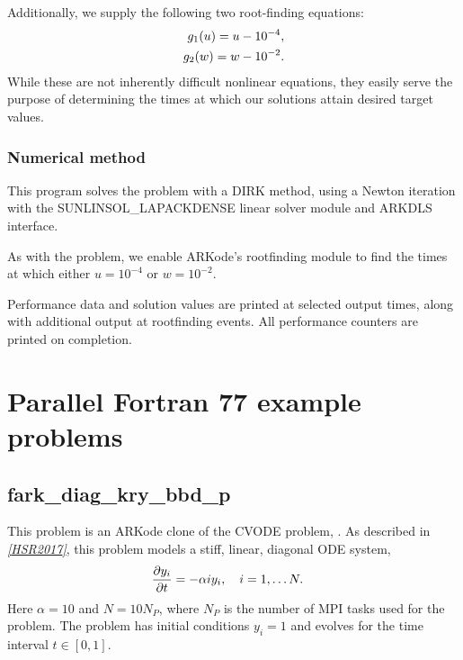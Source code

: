 \documentclass[letterpaper,10pt,english]{sphinxmanual}
\begin{document}
Additionally, we supply the following two root-finding equations:
\begin{gather}
\begin{split}g_1(u) = u - 10^{-4}, \\
g_2(w) = w - 10^{-2}.\end{split}\notag
\end{gather}
While these are not inherently difficult nonlinear equations, they
easily serve the purpose of determining the times at which our
solutions attain desired target values.


\subsection{Numerical method}
\label{f77_serial:id5}
This program solves the problem with a DIRK method, using a Newton
iteration with the SUNLINSOL\_LAPACKDENSE linear solver module and
ARKDLS interface.

As with the {\hyperref[c_serial:ark-robertson-root]{\emph{}}} problem, we enable ARKode's
rootfinding module to find the times at which either \(u=10^{-4}\)
or \(w=10^{-2}\).

Performance data and solution values are printed at
selected output times, along with additional output at rootfinding
events.  All performance counters are printed on completion.


\chapter{Parallel Fortran 77 example problems}
\label{f77_parallel::doc}\label{f77_parallel:parallel-f77}\label{f77_parallel:parallel-fortran-77-example-problems}

\section{fark\_diag\_kry\_bbd\_p}
\label{f77_parallel:fark-diag-kry-bbd-p}\label{f77_parallel:id1}
This problem is an ARKode clone of the CVODE problem,
.  As described in \label{f77_parallel:id2}{\hyperref[References:hsr2017]{\emph{{[}HSR2017{]}}}}, this problem
models a stiff, linear, diagonal ODE system,
\begin{gather}
\begin{split}\frac{\partial y_i}{\partial t} &= -\alpha i y_i, \quad i=1,\ldots N.\end{split}\notag
\end{gather}
Here \(\alpha=10\) and \(N=10 N_P\), where \(N_P\) is the
number of MPI tasks used for the problem.  The problem has initial
conditions \(y_i=1\) and evolves for the time interval \(t\in
[0,1]\).
\end{document}
